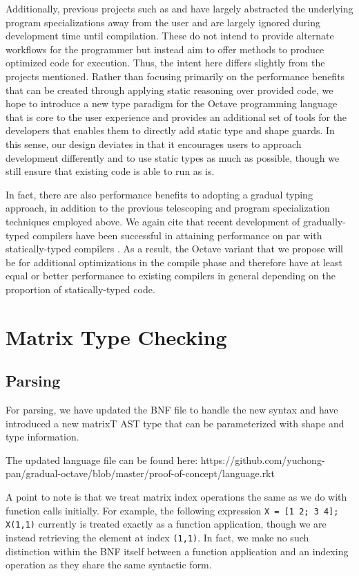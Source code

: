 Additionally, previous projects such as \citet{chauhan2003type} and \citet{olmos2003turning} have largely abstracted the underlying program specializations away from the user and are largely ignored during development time until compilation. These do not intend to provide alternate workflows for the programmer but instead aim to offer methods to produce optimized code for execution. Thus, the intent here differs slightly from the projects mentioned. Rather than focusing primarily on the performance benefits that can be created through applying static reasoning over provided code, we hope to introduce a new type paradigm for the Octave programming language that is core to the user experience and provides an additional set of tools for the developers that enables them to directly add static type and shape guards. In this sense, our design deviates in that it encourages users to approach development differently and to use static types as much as possible, though we still ensure that existing code is able to run as is.

In fact, there are also performance benefits to adopting a gradual typing approach, in addition to the previous telescoping and program specialization techniques employed above. We again cite that recent development of gradually-typed compilers have been successful in attaining performance on par with statically-typed compilers \cite{kuhlenschmidt2018efficient}. As a result, the Octave variant that we propose will be for additional optimizations in the compile phase and therefore have at least equal or better performance to existing compilers in general depending on the proportion of statically-typed code.

\section{Matrix Type Checking}

\subsection{Parsing}
For parsing, we have updated the BNF file to handle the new syntax and have introduced a new matrixT AST type that can be parameterized with shape and type information.

The updated language file can be found here: https://github.com/yuchong-pan/gradual-octave/blob/master/proof-of-concept/language.rkt

A point to note is that we treat matrix index operations the same as we do with function calls initially. For example, the following expression {\tt X = [1 2; 3 4]; X(1,1)} currently is treated exactly as a function application, though we are instead retrieving the element at index {\tt(1,1)}. In fact, we make no such distinction within the BNF itself between a function application and an indexing operation as they share the same syntactic form.


